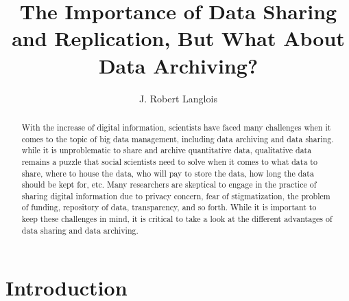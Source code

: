 \documentclass[sigconf]{acmart}
\begin{document}
\title{The Importance of Data Sharing and Replication, But What About Data Archiving?}




\author{J. Robert Langlois}




\begin{abstract}


With the increase of digital information, scientists have faced many challenges when it comes to the topic of big data management, including data archiving and data sharing. while it is unproblematic to share and archive quantitative data, qualitative data remains a puzzle that social scientists need to solve when it comes to what data to share, where to house the data, who will pay to store the data, how long the data should be kept for, etc. Many researchers are skeptical to engage in the practice of sharing digital information due to privacy concern, fear of stigmatization, the problem of funding, repository of data, transparency, and so forth. While it is important to keep these challenges in mind, it is critical to take a look at the different advantages of data sharing and data archiving.

\end{abstract}





\maketitle


\section{Introduction}
\end{document}
